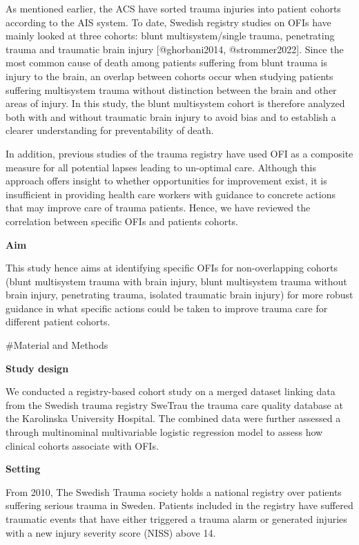 \documentclass[
]{article}
\begin{document}
As mentioned earlier, the ACS have sorted trauma injuries into patient
cohorts according to the AIS system. To date, Swedish registry studies
on OFIs have mainly looked at three cohorts: blunt multisystem/single
trauma, penetrating trauma and traumatic brain injury {[}@ghorbani2014,
@strommer2022{]}. Since the most common cause of death among patients
suffering from blunt trauma is injury to the brain, an overlap between
cohorts occur when studying patients suffering multisystem trauma
without distinction between the brain and other areas of injury. In this
study, the blunt multisystem cohort is therefore analyzed both with and
without traumatic brain injury to avoid bias and to establish a clearer
understanding for preventability of death.

In addition, previous studies of the trauma registry have used OFI as a
composite measure for all potential lapses leading to un-optimal care.
Although this approach offers insight to whether opportunities for
improvement exist, it is insufficient in providing health care workers
with guidance to concrete actions that may improve care of trauma
patients. Hence, we have reviewed the correlation between specific OFIs
and patients cohorts.

\textbf{Aim}

This study hence aims at identifying specific OFIs for non-overlapping
cohorts (blunt multisystem trauma with brain injury, blunt multisystem
trauma without brain injury, penetrating trauma, isolated traumatic
brain injury) for more robust guidance in what specific actions could be
taken to improve trauma care for different patient cohorts.

\#Material and Methods

\textbf{Study design}

We conducted a registry-based cohort study on a merged dataset linking
data from the Swedish trauma registry SweTrau the trauma care quality
database at the Karolinska University Hospital. The combined data were
further assessed a through multinominal multivariable logistic
regression model to assess how clinical cohorts associate with OFIs.

\textbf{Setting}

From 2010, The Swedish Trauma society holds a national registry over
patients suffering serious trauma in Sweden. Patients included in the
registry have suffered traumatic events that have either triggered a
trauma alarm or generated injuries with a new injury severity score
(NISS) above 14.
\end{document}
